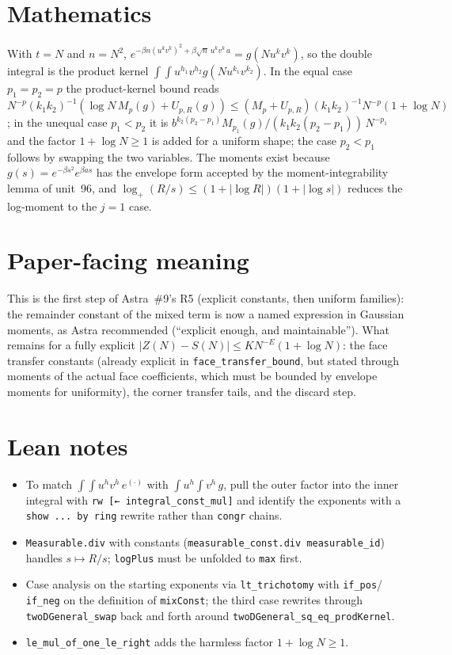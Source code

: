 \documentclass[11pt]{article}
\begin{document}
\section{Mathematics}

With $t=N$ and $n=N^2$, $e^{-\beta n(u^kv^k)^2+\beta\sqrt n\,u^kv^k\,a}=g(N u^kv^k)$, so the double
integral is the product kernel $\int\!\!\int u^{h_1}v^{h_2}g(Nu^{k_1}v^{k_2})$. In the equal case
$p_1=p_2=p$ the product-kernel bound reads $N^{-p}(k_1k_2)^{-1}(\log N\,M_p(g)+U_{p,R}(g))\le
(M_p+U_{p,R})(k_1k_2)^{-1}N^{-p}(1+\log N)$; in the unequal case $p_1<p_2$ it is
$b^{k_2(p_2-p_1)}M_{p_1}(g)/(k_1k_2(p_2-p_1))\,N^{-p_1}$ and the factor $1+\log N\ge1$ is added for a
uniform shape; the case $p_2<p_1$ follows by swapping the two variables. The moments exist because
$g(s)=e^{-\beta s^2}e^{\beta as}$ has the envelope form accepted by the moment-integrability lemma of
unit~96, and $\log_+(R/s)\le(1+|\log R|)(1+|\log s|)$ reduces the log-moment to the $j=1$ case.

\section{Paper-facing meaning}

This is the first step of Astra~\#9's R5 (explicit constants, then uniform families): the
remainder constant of the mixed term is now a named expression in Gaussian moments, as Astra
recommended (``explicit enough, and maintainable''). What remains for a fully explicit
$|Z(N)-S(N)|\le KN^{-E}(1+\log N)$: the face transfer constants (already explicit in
\texttt{face\_transfer\_bound}, but stated through moments of the actual face coefficients, which
must be bounded by envelope moments for uniformity), the corner transfer tails, and the discard step.

\section{Lean notes}

\begin{itemize}
\item To match $\int\!\!\int u^hv^h\,e^{(\cdot)}$ with $\int u^h\int v^h\,g$, pull the outer
factor into the inner integral with \texttt{rw [← integral\_const\_mul]} and identify the
exponents with a \texttt{show ... by ring} rewrite rather than \texttt{congr} chains.
\item \texttt{Measurable.div} with constants (\texttt{measurable\_const.div measurable\_id}) handles
$s\mapsto R/s$; \texttt{logPlus} must be unfolded to \texttt{max} first.
\item Case analysis on the starting exponents via \texttt{lt\_trichotomy} with \texttt{if\_pos}/
\texttt{if\_neg} on the definition of \texttt{mixConst}; the third case rewrites through
\texttt{twoDGeneral\_swap} back and forth around \texttt{twoDGeneral\_sq\_eq\_prodKernel}.
\item \texttt{le\_mul\_of\_one\_le\_right} adds the harmless factor $1+\log N\ge1$.
\end{itemize}
\end{document}

